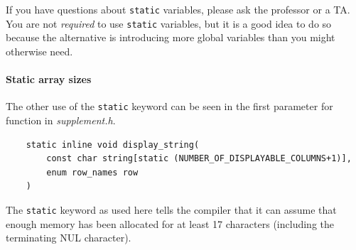 If you have questions about \lstinline{static} variables, please ask the professor or a TA.
You are not \textit{required} to use \lstinline{static} variables, but it is a good idea to do so because the alternative is introducing more global variables than you might otherwise need.

\paragraph{Static array sizes}

The other use of the \lstinline{static} keyword can be seen in the first parameter for  function in \textit{supplement.h}.
\begin{lstlisting}
    static inline void display_string(
        const char string[static (NUMBER_OF_DISPLAYABLE_COLUMNS+1)],
        enum row_names row
    )
\end{lstlisting}
%
%
The \lstinline{static} keyword as used here tells the compiler that it can assume that enough memory has been allocated for at least 17 characters (including the terminating NUL character).
